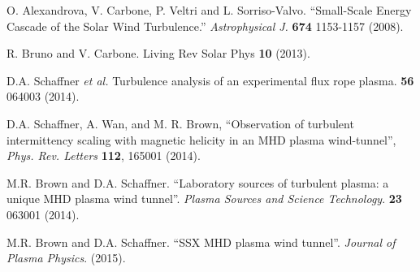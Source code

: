 \documentclass[aps,prl,amsmath,amssymb,reprint,superscriptaddress]{revtex4-1} %
\begin{document}
\begin{thebibliography}{99}
 O. Alexandrova, V. Carbone, P. Veltri and L. Sorriso-Valvo. ``Small-Scale Energy Cascade of the Solar Wind Turbulence.'' {\it Astrophysical J.} {\bf 674} 1153-1157 (2008).

 R. Bruno and V. Carbone. Living Rev Solar Phys {\bf 10} (2013).







 D.A. Schaffner {\it et al.} Turbulence analysis of an experimental flux rope plasma. {\bf 56} 064003 (2014).

 D.A. Schaffner, A. Wan, and M. R. Brown, ``Observation of turbulent intermittency scaling with magnetic helicity in an MHD plasma wind-tunnel'', {\it Phys. Rev. Letters} {\bf 112}, 165001 (2014).



 M.R. Brown and D.A. Schaffner. ``Laboratory sources of turbulent plasma: a unique MHD plasma wind tunnel''. {\it Plasma Sources and Science Technology}. {\bf 23} 063001 (2014).

 M.R. Brown and D.A. Schaffner. ``SSX MHD plasma wind tunnel''. {\it Journal of Plasma Physics}. (2015).









\end{thebibliography}
\end{document}
